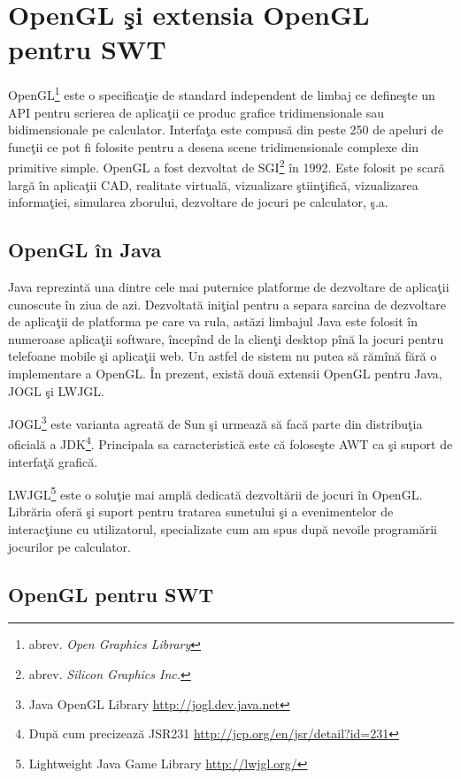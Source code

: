 \section{OpenGL şi extensia OpenGL pentru SWT}

OpenGL\footnote{abrev. \textit{Open Graphics Library}} este o specificaţie de 
standard independent de limbaj ce defineşte un API pentru scrierea de 
aplicaţii ce produc grafice tridimensionale sau bidimensionale pe calculator. 
Interfaţa este compusă din peste 250 de apeluri de funcţii ce pot fi folosite 
pentru a desena scene tridimensionale complexe din primitive simple. OpenGL a 
fost dezvoltat de SGI\footnote{abrev. \textit{Silicon Graphics Inc.}} în 1992. 
Este folosit pe scară largă în aplicaţii CAD, realitate virtuală, vizualizare 
ştiinţifică, vizualizarea informaţiei, simularea zborului, dezvoltare de jocuri 
pe calculator, ş.a. \cite{oglwiki}

\subsection{OpenGL în Java}
Java reprezintă una dintre cele mai puternice platforme de dezvoltare de 
aplicaţii cunoscute în ziua de azi. Dezvoltată iniţial pentru a separa sarcina 
de dezvoltare de aplicaţii de platforma pe care va rula, astăzi limbajul Java 
este folosit în numeroase aplicaţii software, începînd de la clienţi desktop 
pînă la jocuri pentru telefoane mobile şi aplicaţii web. Un astfel de sistem nu 
putea să rămînă fără o implementare a OpenGL. În prezent, există două extensii 
OpenGL pentru Java, JOGL şi LWJGL.

JOGL\footnote{Java OpenGL Library \url{http://jogl.dev.java.net}} este varianta 
agreată de Sun şi urmează să facă parte din distribuţia oficială a 
JDK\footnote{După cum precizează JSR231 
\url{http://jcp.org/en/jsr/detail?id=231}}. Principala sa caracteristică este 
că foloseşte AWT ca şi suport de interfaţă grafică.

LWJGL\footnote{Lightweight Java Game Library \url{http://lwjgl.org/}} este o 
soluţie mai amplă dedicată dezvoltării de jocuri în OpenGL. Librăria oferă şi 
suport pentru tratarea sunetului şi a evenimentelor de interacţiune cu 
utilizatorul, specializate cum am spus după nevoile programării jocurilor pe 
calculator.

\subsection{OpenGL pentru SWT}

